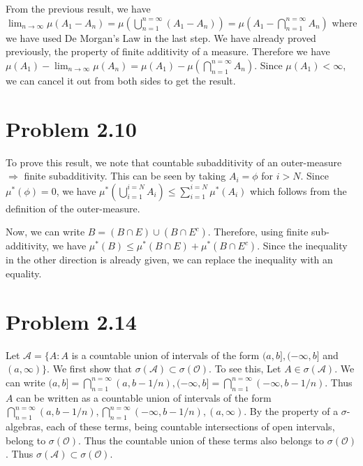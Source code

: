 \documentclass[letterpaper,12pt]{article}
\theoremstyle{definition}
\begin{document}
    From the previous result, we have $\lim_{n \rightarrow \infty}\mu(A_1 - A_n) = \mu(\bigcup_{n=1}^{n=\infty}(A_1 - A_n)) = \mu(A_1 - \bigcap_{n=1}^{n=\infty}A_n)$ where we have used De Morgan's Law in the last step. We have already proved previously, the property of finite additivity of a measure. Therefore we have $\mu(A_1) - \lim_{n \rightarrow \infty}\mu(A_n) = \mu(A_1) - \mu(\bigcap_{n=1}^{n=\infty}A_n)$. Since $\mu(A_1) < \infty$, we can cancel it out from both sides to get the result.

  \section*{Problem 2.10}

    To prove this result, we note that countable subadditivity of an outer-measure $\Rightarrow$ finite subadditivity. This can be seen by taking $A_i = \phi$ for $i > N$. Since $\mu^*(\phi)= 0$, we have
    $\mu^*(\bigcup_{i=1}^{i=N}A_i) \le \sum_{i=1}^{i=N}\mu^*(A_i)$ which follows from the definition of the outer-measure.
    \newline

    Now, we can write $B = (B \cap E) \cup (B \cap E^c)$. Therefore, using finite sub-additivity, we have $\mu^*(B) \le \mu^*(B \cap E) + \mu^*(B \cap E^c)$. Since the inequality in the other direction is already given, we can replace the inequality with an equality.

  \section*{Problem 2.14}

    Let $\mathcal A = \{A: A$ is a countable union of intervals of the form $(a,b], (-\infty, b]$ and $(a, \infty)\}$. We first show that $\sigma(\mathcal A) \subset \sigma(\mathcal O)$. To see this,
   Let $A \in \sigma(\mathcal A)$. We can write $(a,b] = \bigcap_{n=1}^{n=\infty}(a, b - 1/n), (- \infty, b] = \bigcap_{n=1}^{n=\infty}(-\infty, b- 1/n)$. Thus $A$ can be written as a countable union of intervals of the form $\bigcap_{n=1}^{n=\infty}(a, b-1/n), \bigcap_{n=1}^{n=\infty}(-\infty, b-1/n), (a, \infty)$. By the property of a $\sigma$- algebras, each of these terms, being countable intersections of  open intervals, belong to $\sigma(\mathcal O)$. Thus the countable union of these terms also belongs to $\sigma(\mathcal O)$. Thus $\sigma(\mathcal A) \subset \sigma(\mathcal O)$.
\newline
\end{document}
